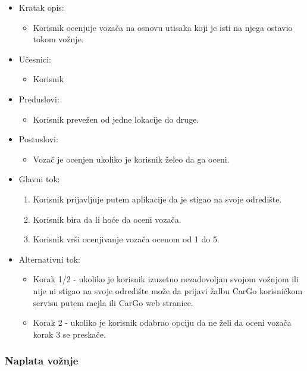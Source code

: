 \begin{itemize}
	\item Kratak opis:
		\begin{itemize}
			\item Korisnik ocenjuje vozača na osnovu utisaka koji je isti na njega ostavio tokom vožnje.
		\end{itemize}
	\item Učesnici:
		\begin{itemize}
			\item Korisnik
		\end{itemize}				
	\item Preduslovi:
		\begin{itemize}
		    \item Korisnik prevežen od jedne lokacije do druge.
		\end{itemize}
	\item Postuslovi:
		\begin{itemize}
			\item Vozač je ocenjen ukoliko je korisnik želeo da ga oceni.
		\end{itemize}		
	\item Glavni tok:
		\begin{enumerate}
		    \item Korisnik prijavljuje putem aplikacije da je stigao na svoje odredište.
		    \item Korisnik bira da li hoće da oceni vozača.
		    \item Korisnik vrši ocenjivanje vozača ocenom od 1 do 5. 
		\end{enumerate}
	\item Alternativni tok:
		\begin{itemize}
		    \item Korak 1/2 - ukoliko je korisnik izuzetno nezadovoljan svojom vožnjom ili nije ni stigao na svoje odredište može da prijavi žalbu CarGo korisničkom servisu putem mejla ili CarGo web stranice.
    		\item Korak 2 - ukoliko je korisnik odabrao opciju da ne želi da oceni vozača korak 3 se preskače.
		\end{itemize}
\end{itemize}


\subsubsection{\bfseries Naplata vožnje}

